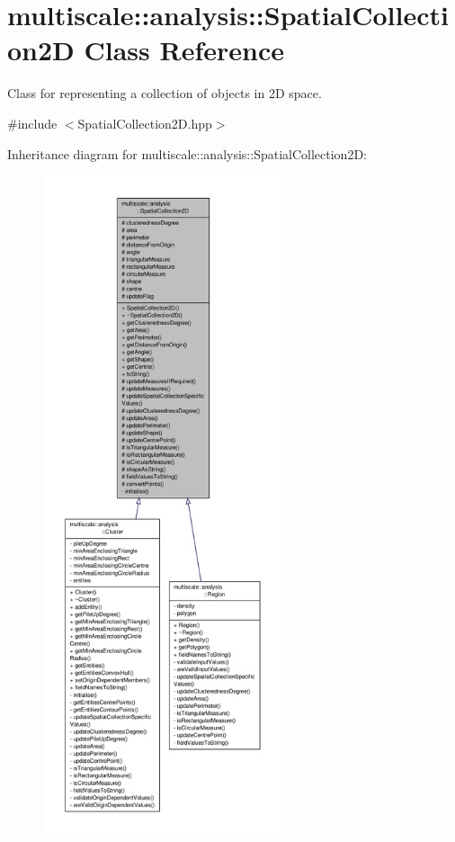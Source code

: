 \hypertarget{classmultiscale_1_1analysis_1_1SpatialCollection2D}{\section{multiscale\-:\-:analysis\-:\-:Spatial\-Collection2\-D Class Reference}
\label{classmultiscale_1_1analysis_1_1SpatialCollection2D}
}


Class for representing a collection of objects in 2\-D space.  




{\ttfamily \#include $<$Spatial\-Collection2\-D.\-hpp$>$}



Inheritance diagram for multiscale\-:\-:analysis\-:\-:Spatial\-Collection2\-D\-:\nopagebreak
\begin{figure}[H]
\begin{center}
\leavevmode
\includegraphics[height=550pt]{classmultiscale_1_1analysis_1_1SpatialCollection2D__inherit__graph}
\end{center}
\end{figure}


